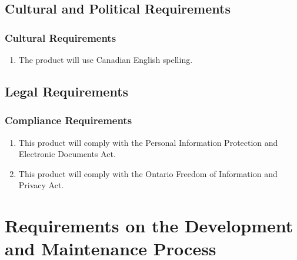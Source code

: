 \documentclass[english]{article}
\begin{document}

\subsection{Cultural and Political Requirements}
\label{sub:cultural_and_political_requirements}

\subsubsection{Cultural Requirements}
\label{ssub:cultural_requirements}
\begin{enumerate}[{CCR}1. ]
\item The product will use Canadian English spelling.
\end{enumerate}


\subsection{Legal Requirements}
\label{sub:legal_requirements}

\subsubsection{Compliance Requirements}
\label{ssub:compliance_requirements}
\begin{enumerate}[{LCR}1. ]
\item This product will comply with the Personal Information Protection and Electronic Documents Act.
	\item This product will comply with the Ontario Freedom of Information and Privacy Act.
\end{enumerate}


\section{Requirements on the Development and Maintenance Process}
\label{sub:req on dev and maint}


\end{document}
